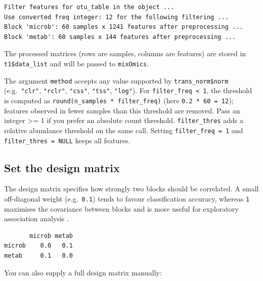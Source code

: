 \documentclass[
]{book}
\newenvironment{Shaded}{\begin{snugshade}}{\end{snugshade}}
\newcommand{\AttributeTok}[1]{\textcolor[rgb]{0.13,0.29,0.53}{#1}}
\newcommand{\FloatTok}[1]{\textcolor[rgb]{0.00,0.00,0.81}{#1}}
\newcommand{\FunctionTok}[1]{\textcolor[rgb]{0.13,0.29,0.53}{\textbf{#1}}}
\newcommand{\NormalTok}[1]{#1}
\newcommand{\SpecialCharTok}[1]{\textcolor[rgb]{0.81,0.36,0.00}{\textbf{#1}}}
\begin{document}
\begin{verbatim}
Filter features for otu_table in the object ...
Use converted freq integer: 12 for the following filtering ...
Block 'microb': 60 samples x 1241 features after preprocessing ...
Block 'metab': 60 samples x 144 features after preprocessing ...
\end{verbatim}

The processed matrices (rows are samples, columns are features) are stored in \texttt{t1\$data\_list} and will be passed to \texttt{mixOmics}.

The argument \texttt{method} accepts any value supported by \texttt{trans\_norm\$norm} (e.g.~\texttt{"clr"}, \texttt{"rclr"}, \texttt{"css"}, \texttt{"tss"}, \texttt{"log"}).
For \texttt{filter\_freq\ \textless{}\ 1}, the threshold is computed as \texttt{round(n\_samples\ *\ filter\_freq)} (here \texttt{0.2\ *\ 60\ =\ 12}); features observed in fewer samples than this threshold are removed.
Pass an integer \textgreater= 1 if you prefer an absolute count threshold.
\texttt{filter\_thres} adds a relative abundance threshold on the same call.
Setting \texttt{filter\_freq\ =\ 1} and \texttt{filter\_thres\ =\ NULL} keeps all features.

\subsection{Set the design matrix}\label{set-the-design-matrix}

The design matrix specifies how strongly two blocks should be correlated.
A small off-diagonal weight (e.g.~\texttt{0.1}) tends to favour classification accuracy, whereas \texttt{1} maximises the covariance between blocks and is more useful for exploratory association analysis \citep{Singh_DIABLO_2019}.

\begin{Shaded}
\end{Shaded}

\begin{verbatim}
       microb metab
microb    0.0   0.1
metab     0.1   0.0
\end{verbatim}

You can also supply a full design matrix manually:
\end{document}
